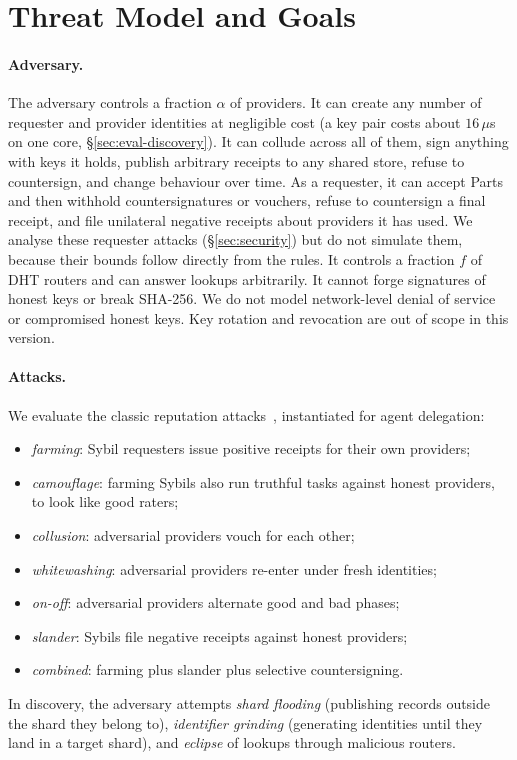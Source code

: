 \section{Threat Model and Goals}
\label{sec:threat}

\paragraph{Adversary.}
The adversary controls a fraction $\alpha$ of providers. It can create any
number of requester and provider identities at negligible cost (a key pair
costs about $16\,\mu$s on one core, \S\ref{sec:eval-discovery}). It can
collude across all of them, sign anything with keys it holds, publish
arbitrary receipts to any shared store, refuse to countersign, and change
behaviour over time. As a requester, it can accept Parts and then
withhold countersignatures or vouchers, refuse to countersign a final
receipt, and file unilateral negative receipts about providers it has
used. We analyse these requester attacks (\S\ref{sec:security}) but do
not simulate them, because their bounds follow directly from the rules. It controls a fraction $f$ of DHT routers and can
answer lookups arbitrarily. It cannot forge signatures of honest keys or
break SHA-256. We do not model network-level denial of service or
compromised honest keys. Key rotation and revocation are out of scope in
this version.

\paragraph{Attacks.}
We evaluate the classic reputation
attacks~\cite{hoffman2009survey,douceur2002sybil,feldman2006whitewashing},
instantiated for agent delegation:
\begin{itemize}
\item \emph{farming}: Sybil requesters issue positive receipts for their
  own providers;
\item \emph{camouflage}: farming Sybils also run truthful tasks against
  honest providers, to look like good raters;
\item \emph{collusion}: adversarial providers vouch for each other;
\item \emph{whitewashing}: adversarial providers re-enter under fresh
  identities;
\item \emph{on-off}: adversarial providers alternate good and bad
  phases;
\item \emph{slander}: Sybils file negative receipts against honest
  providers;
\item \emph{combined}: farming plus slander plus selective
  countersigning.
\end{itemize}
In discovery, the adversary attempts \emph{shard flooding} (publishing
records outside the shard they belong to), \emph{identifier grinding}
(generating identities until they land in a target shard), and
\emph{eclipse} of lookups through malicious routers.

